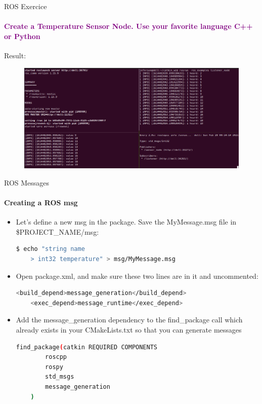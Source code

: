 \documentclass[aspectratio=169]{beamer}
\begin{document}
\begin{frame}{ROS Exercice}
	\framesubtitle{\textcolor{purple}{Create a Temperature Sensor Node. Use your favorite language C++ or Python}}
	Result:
	\begin{figure}
		\includegraphics[width=1\textwidth]{./images/ros_sensor_example.png}
	\end{figure}
\end{frame}


\begin{frame}[fragile]{ROS Messages}
	\framesubtitle{Creating a ROS msg}
    \begin{itemize}
        \item Let's define a new msg in the package. Save the MyMessage.msg file in \$PROJECT\_NAME/msg:
		\begin{lstlisting}[language=bash]
	$ echo "string name
	> int32 temperature" > msg/MyMessage.msg
		\end{lstlisting}
		\item Open package.xml, and make sure these two lines are in it and uncommented:
		\begin{lstlisting}[language=bash]
	<build_depend>message_generation</build_depend>
	<exec_depend>message_runtime</exec_depend>
		\end{lstlisting}
		\item Add the message\_generation dependency to the find\_package call which already exists in your CMakeLists.txt so that you can generate messages
		\begin{lstlisting}[language=bash]
	find_package(catkin REQUIRED COMPONENTS
		roscpp
		rospy
		std_msgs
		message_generation
	)
		\end{lstlisting}

	
    \end{itemize}
\end{frame}
\end{document}
